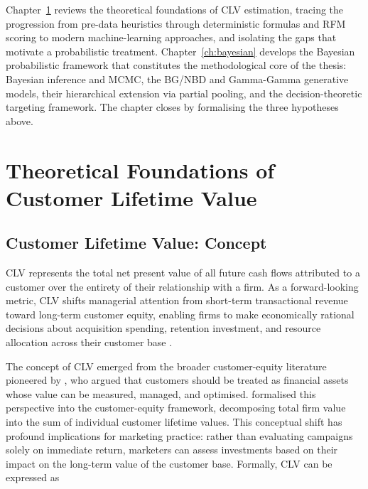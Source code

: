 \documentclass[12pt, a4paper, oneside]{report}
\begin{document}
Chapter~\ref{ch:foundations} reviews the theoretical foundations of CLV estimation, tracing the progression from pre-data heuristics through deterministic formulas and RFM scoring to modern machine-learning approaches, and isolating the gaps that motivate a probabilistic treatment. Chapter~\ref{ch:bayesian} develops the Bayesian probabilistic framework that constitutes the methodological core of the thesis: Bayesian inference and MCMC, the BG/NBD and Gamma-Gamma generative models, their hierarchical extension via partial pooling, and the decision-theoretic targeting framework. The chapter closes by formalising the three hypotheses above.

\chapter{Theoretical Foundations of Customer Lifetime Value}
\label{ch:foundations}

\section{Customer Lifetime Value: Concept}
\label{sec:clv-concept}

CLV represents the total net present value of all future cash flows attributed to a customer over the entirety of their relationship with a firm. As a forward-looking metric, CLV shifts managerial attention from short-term transactional revenue toward long-term customer equity, enabling firms to make economically rational decisions about acquisition spending, retention investment, and resource allocation across their customer base \parencite{gupta2006}.

The concept of CLV emerged from the broader customer-equity literature pioneered by \textcite{blattberg1996}, who argued that customers should be treated as financial assets whose value can be measured, managed, and optimised. \textcite{rust2000} formalised this perspective into the customer-equity framework, decomposing total firm value into the sum of individual customer lifetime values. This conceptual shift has profound implications for marketing practice: rather than evaluating campaigns solely on immediate return, marketers can assess investments based on their impact on the long-term value of the customer base. Formally, CLV can be expressed as
\end{document}
